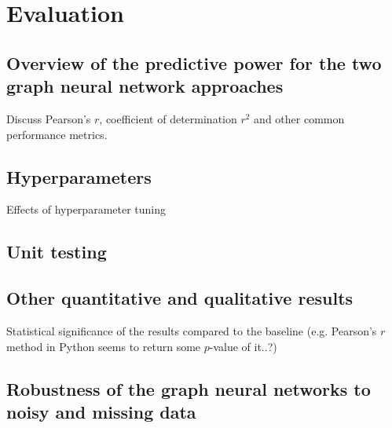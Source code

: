 \documentclass[12pt,a4paper,twoside, openright, hidelinks]{report}
\begin{document}
\chapter{Evaluation}

\section{Overview of the predictive power for the two graph neural network approaches}

Discuss Pearson's $r$, coefficient of determination $r^2$ and other common performance metrics.

\section{Hyperparameters}
Effects of hyperparameter tuning

\section{Unit testing}

\section{Other quantitative and qualitative results}
Statistical significance of the results compared to the baseline (e.g. Pearson's $r$ method in Python seems to return some $p$-value of it..?)

\section{Robustness of the graph neural networks to noisy and missing data}
\end{document}
